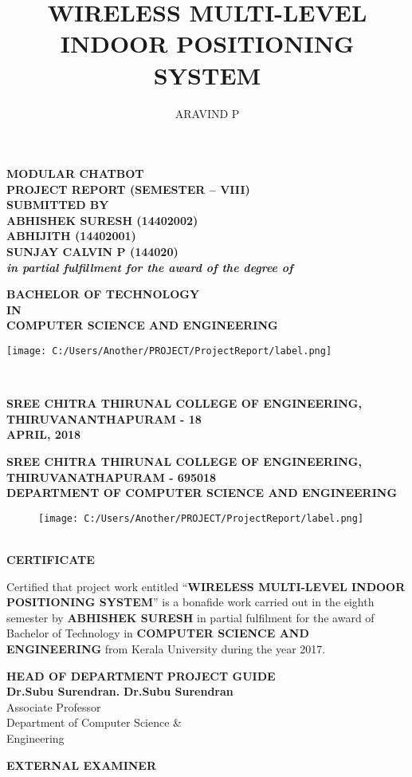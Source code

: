 \documentclass[a4paper,12pt]{report}
\title{WIRELESS MULTI-LEVEL INDOOR POSITIONING SYSTEM}
\author{ARAVIND P}
\newcommand*{\plogo}{
    \texttt{[image: C:/Users/Another/PROJECT/ProjectReport/label.png]} %
    \iffalse
      \texttt{[image: C:/Users/Another/PROJECT/ProjectReport/label.png]} %
    \fi
}
\newcommand*{\titleGP}{\begingroup %
\centering %
\vspace*{-25pt} %

\textbf{
{\LARGE MODULAR CHATBOT}\\[\baselineskip] %
}
\textbf{PROJECT REPORT (SEMESTER – VIII)}\\
[\baselineskip]
\textbf{SUBMITTED BY}\\
[\baselineskip]
\textbf{ABHISHEK SURESH (14402002)}\\
\textbf{ABHIJITH (14402001)}\\
\textbf{SUNJAY CALVIN P (144020)}\\
[\baselineskip]
\textbf{\textit{in partial fulfillment for the award of the degree of}}\\
[\baselineskip]



{\Large \textbf{BACHELOR OF TECHNOLOGY} \\ \textbf{IN} \\ \textbf{COMPUTER SCIENCE AND ENGINEERING}\\ \par} %


\vspace*{1cm}%

\plogo \\[0.1\baselineskip] %

\vspace*{1cm}

{\large \textbf{SREE CHITRA THIRUNAL COLLEGE OF ENGINEERING,}\\
\textbf{THIRUVANANTHAPURAM - 18}\\
\textbf{APRIL, 2018}\\[\baselineskip]}\par %
\newpage
\endgroup}
\begin{document}
 

\pagestyle{empty} %
\titleGP %


\begin{center}
  \textbf{\large SREE CHITRA THIRUNAL COLLEGE OF ENGINEERING,}\\
  
  \textbf{THIRUVANATHAPURAM - 695018}\\

  \textbf{DEPARTMENT OF COMPUTER SCIENCE AND ENGINEERING}
  \newline
  \begin{figure}[h!]
    \begin{center}
    	\plogo
    \end{center}
  \end{figure}
  \\[0.3\baselineskip]
  
  \Large \textbf{CERTIFICATE}\\
  [\baselineskip]
  \end{center}
  \par 
  Certified that project work entitled “\textbf{WIRELESS MULTI-LEVEL INDOOR POSITIONING SYSTEM}” is a bonafide work carried out in the eighth semester by \textbf{ABHISHEK SURESH} in partial fulfilment for the award of Bachelor of Technology in \textbf{COMPUTER SCIENCE AND ENGINEERING} from Kerala University during the year 2017.

  \vspace{2cm}
  
  \begin{flushleft}
  	\textbf{HEAD OF DEPARTMENT} \hspace{3.5cm}\textbf{PROJECT GUIDE} \\
  	\textbf{Dr.Subu Surendran.} \hspace{5.05cm}\textbf{Dr.Subu Surendran} \\
  	{Associate Professor} \hspace{5.8cm}{Assistant Professor} \\
  	{Department of Computer Science \& \hspace{2.8cm}{Department of Computer Science \&}} \\
  	{Engineering} \hspace{7.15cm}{Engineering}
  \end{flushleft}
  
  \vspace{2cm}
  
  \begin{center}
	  \textbf{EXTERNAL EXAMINER}
  \end{center}
\end{document}
